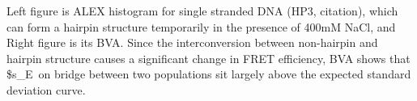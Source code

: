 Left figure is ALEX histogram for single stranded DNA (HP3, citation), which can form a hairpin structure temporarily in the presence of 400mM NaCl, and Right figure is its BVA. Since the interconversion between non-hairpin and hairpin structure causes a significant change in FRET efficiency, BVA shows that \$s_E\ on bridge between two populations sit largely above the expected standard deviation curve.